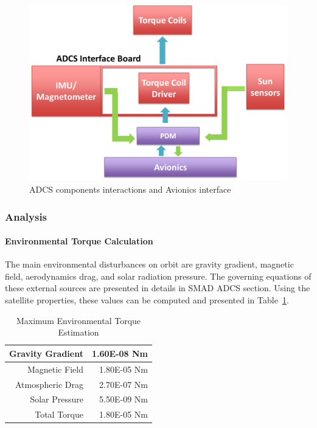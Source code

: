 \documentclass[12pt]{article}
\begin{document}
			\begin{figure}[!ht]
				\centering
				\includegraphics[scale=0.5]{images/ADCS_schem.png}
				\caption{ADCS components interactions and Avionics interface}
				\label{fig:ADCS_schem}
			\end{figure}
			
			\subsubsection{Analysis}
				\paragraph{Environmental Torque Calculation}
				The main environmental disturbances on orbit are gravity gradient, magnetic field, aerodynamics drag, and solar radiation pressure. The governing equations of these external sources are presented in details in SMAD ADCS section. Using the satellite properties, these values can be computed and presented in Table~\ref{tab:ADCS_envtorque}. 
				
\begin{table}[htbp!]
  \centering
  \caption{Maximum Environmental Torque Estimation}
    \begin{tabular}{|r|r|}
    \hline
    Gravity Gradient & 1.60E-08 Nm \bigstrut\\
    \hline
    Magnetic Field & 1.80E-05 Nm \bigstrut\\
    \hline
    Atmospheric Drag & 2.70E-07 Nm \bigstrut\\
    \hline
    Solar Pressure & 5.50E-09 Nm \bigstrut\\
    \hline
    Total Torque & 1.80E-05 Nm \bigstrut\\
    \hline
    \end{tabular}%
  \label{tab:ADCS_envtorque}%
\end{table}%
\end{document}
